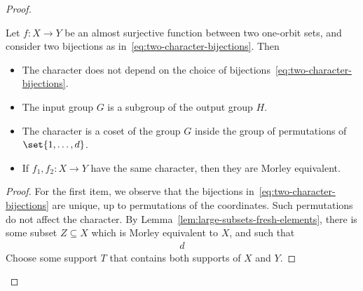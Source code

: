 \begin{proof}
    \begin{claim}
        Let $f : X \to Y$ be an almost surjective function between two one-orbit sets, and consider two bijections as in~\eqref{eq:two-character-bijections}. Then 
        \begin{itemize}
            \item The character does not depend on the choice of bijections~\eqref{eq:two-character-bijections}.
            \item The input group $G$ is a subgroup of the output group $H$.
            \item The character is a coset of the group $G$ inside the group of permutations of $\set{1,\ldots,d}$.
            \item If $f_1, f_2 : X \to Y$ have the same character, then they are Morley equivalent.
        \end{itemize}
    \end{claim}
    \begin{proof}
        For the first item, we observe that the bijections in~\eqref{eq:two-character-bijections} are unique, up to permutations of the coordinates. Such permutations do not affect the character. 
        By Lemma~\ref{lem:large-subsets-fresh-elements}, there is some subset $Z \subseteq X$ which is Morley equivalent to $X$, and such that 
        \begin{align*}
d
        \end{align*}
        Choose some support $T$ that contains both supports of $X$ and $Y$. 
    \end{proof}


\end{proof}
